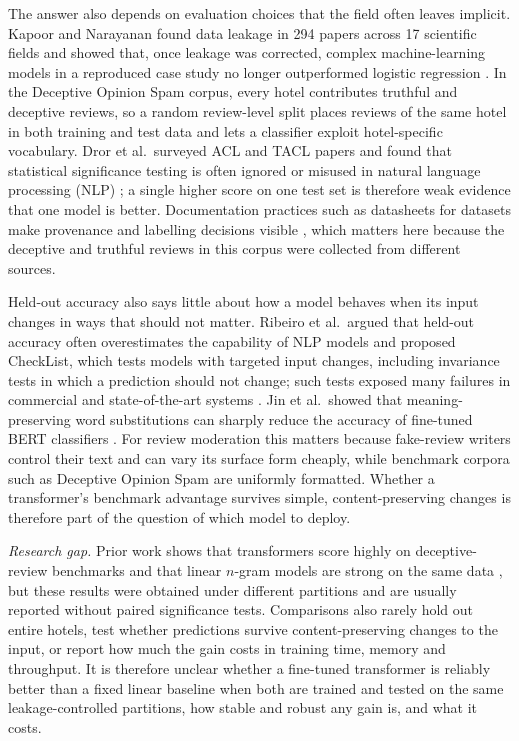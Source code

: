 The answer also depends on evaluation choices that the field often leaves implicit. Kapoor and Narayanan found data leakage in 294 papers across 17 scientific fields and showed that, once leakage was corrected, complex machine-learning models in a reproduced case study no longer outperformed logistic regression \cite{kapoor2023}. In the Deceptive Opinion Spam corpus, every hotel contributes truthful and deceptive reviews, so a random review-level split places reviews of the same hotel in both training and test data and lets a classifier exploit hotel-specific vocabulary. Dror et al.\ surveyed ACL and TACL papers and found that statistical significance testing is often ignored or misused in natural language processing (NLP) \cite{dror2018}; a single higher score on one test set is therefore weak evidence that one model is better. Documentation practices such as datasheets for datasets make provenance and labelling decisions visible \cite{gebru2021}, which matters here because the deceptive and truthful reviews in this corpus were collected from different sources.

Held-out accuracy also says little about how a model behaves when its input changes in ways that should not matter. Ribeiro et al.\ argued that held-out accuracy often overestimates the capability of NLP models and proposed CheckList, which tests models with targeted input changes, including invariance tests in which a prediction should not change; such tests exposed many failures in commercial and state-of-the-art systems \cite{ribeiro2020}. Jin et al.\ showed that meaning-preserving word substitutions can sharply reduce the accuracy of fine-tuned BERT classifiers \cite{jin2020}. For review moderation this matters because fake-review writers control their text and can vary its surface form cheaply, while benchmark corpora such as Deceptive Opinion Spam are uniformly formatted. Whether a transformer's benchmark advantage survives simple, content-preserving changes is therefore part of the question of which model to deploy.

\emph{Research gap.} Prior work shows that transformers score highly on deceptive-review benchmarks and that linear $n$-gram models are strong on the same data \cite{ref22,feng2012}, but these results were obtained under different partitions and are usually reported without paired significance tests. Comparisons also rarely hold out entire hotels, test whether predictions survive content-preserving changes to the input, or report how much the gain costs in training time, memory and throughput. It is therefore unclear whether a fine-tuned transformer is reliably better than a fixed linear baseline when both are trained and tested on the same leakage-controlled partitions, how stable and robust any gain is, and what it costs.

